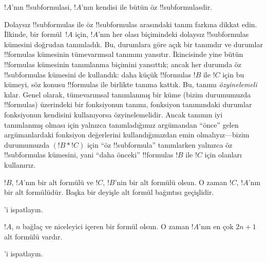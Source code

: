 \documentclass[../../../include/open-logic-section]{subfiles}
\begin{document}
\begin{defn}[!!^{subformula}]
$!A$'nın !!{subformula}s{}i, $!A$'nın kendisi ile bütün öz
!!{subformula}s{}dir.
\end{defn}

\begin{explain}
Dolaysız !!{subformula}s ile öz !!{subformula}s arasındaki tanım
farkına dikkat edin. İlkinde, bir formül~$!A$ için, $!A$'nın her olası
biçimindeki dolaysız !!{subformula}s kümesini doğrudan tanımladık. Bu,
durumlara göre açık bir tanımdır ve durumlar
!!{formula}s kümesinin tümevarımsal tanımını yansıtır. İkincisinde yine
bütün !!{formula}s kümesinin tanımlanma biçimini yansıttık; ancak her
durumda öz !!{subformula}s kümesini de kullandık: daha küçük
!!{formula}s $!B$ ile $!C$ için bu kümeyi, söz konusu !!{formula}s ile
birlikte tanıma kattık. Bu, tanımı \emph{özyinelemeli}
kılar. Genel olarak, tümevarımsal tanımlanmış bir küme (bizim
durumumuzda !!{formula}s) üzerindeki bir fonksiyonun tanımı, fonksiyon
tanımındaki durumlar fonksiyonun kendisini kullanıyorsa özyinelemelidir.
Ancak tanımın iyi tanımlanmış olması için yalnızca tanımladığımız
argümandan ``önce'' gelen argümanlardaki fonksiyon değerlerini
kullandığımızdan emin olmalıyız---bizim durumumuzda $(!B \ast !C)$ için
``öz !!{subformula}'' tanımlarken yalnızca öz !!{subformula}s kümesini, yani
``daha önceki'' !!{formula}s $!B$ ile $!C$ için olanları kullanırız.
\end{explain}

\begin{prop}
$!B$, $!A$'nın bir alt formülü ve $!C$, $!B$'nin bir alt formülü olsun.
O zaman $!C$, $!A$'nın bir alt formülüdür. Başka bir deyişle alt formül
bağıntısı geçişlidir.
\end{prop}

\begin{prob}
'i ispatlayın.
\end{prob}

\begin{prop}
$!A$, $n$ bağlaç ve niceleyici içeren bir formül olsun. O zaman $!A$'nın
en çok $2n+1$ alt formülü vardır.
\end{prop}

\begin{prob}
'i ispatlayın.
\end{prob}
\end{document}
